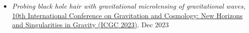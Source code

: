 \begin{itemize}
    \item \textit{Probing black hole hair with gravitational microlensing of gravitational waves}, \href{https://indico.cern.ch/event/1268737/registrations/participants}{10th International Conference on Gravitation and Cosmology: New Horizons and Singularities in Gravity (ICGC 2023)}. \hfill{Dec 2023}

\end{itemize}